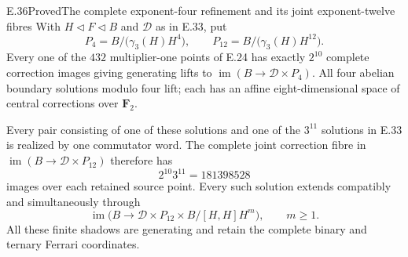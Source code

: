 \begin{statement}{E.36}{Proved}{The complete exponent-four refinement and its joint exponent-twelve fibres}
With $H\triangleleft F\triangleleft B$ and $\mathscr D$
as in E.33, put
\[
 P_4=B/\bigl(\gamma_3(H)H^4\bigr),\qquad
 P_{12}=B/\bigl(\gamma_3(H)H^{12}\bigr).
 \tag{E.36.1}
\]
Every one of the $432$ multiplier-one points of E.24
has exactly $2^{10}$ complete correction images giving
generating lifts to
$\operatorname{im}(B\to\mathscr D\times P_4)$.
All four abelian boundary solutions modulo four lift;
each has an affine eight-dimensional space of central
corrections over $\mathbf F_2$.

Every pair consisting of one of these solutions and one
of the $3^{11}$ solutions in E.33 is realized by one
commutator word.  The complete joint correction fibre
in $\operatorname{im}(B\to\mathscr D\times P_{12})$
therefore has
\[
                 2^{10}3^{11}=181398528
 \tag{E.36.2}
\]
images over each retained source point.
Every such solution extends compatibly and simultaneously
through
\[
 \operatorname{im}\bigl(
 B\longrightarrow
 \mathscr D\times P_{12}\times B/[H,H]H^m\bigr),
                       \qquad m\ge1.
 \tag{E.36.3}
\]
All these finite shadows are generating and retain
the complete binary and ternary Ferrari coordinates.
\end{statement}
